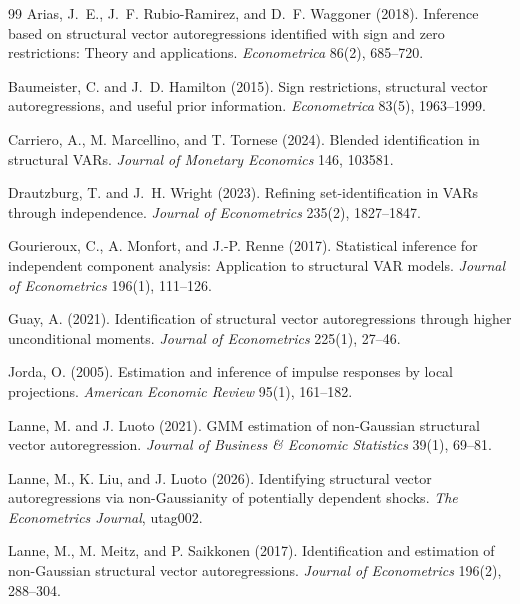 \documentclass[11pt]{article}
\theoremstyle{definition}
\theoremstyle{plain}
\theoremstyle{remark}
\begin{document}
\begin{thebibliography}{99}
Arias, J.~E., J.~F. Rubio-Ramirez, and D.~F. Waggoner (2018).
Inference based on structural vector autoregressions identified with sign and zero restrictions: Theory and applications.
\emph{Econometrica} 86(2), 685--720.

Baumeister, C. and J.~D. Hamilton (2015).
Sign restrictions, structural vector autoregressions, and useful prior information.
\emph{Econometrica} 83(5), 1963--1999.

Carriero, A., M. Marcellino, and T. Tornese (2024).
Blended identification in structural VARs.
\emph{Journal of Monetary Economics} 146, 103581.

Drautzburg, T. and J.~H. Wright (2023).
Refining set-identification in VARs through independence.
\emph{Journal of Econometrics} 235(2), 1827--1847.

Gourieroux, C., A. Monfort, and J.-P. Renne (2017).
Statistical inference for independent component analysis: Application to structural VAR models.
\emph{Journal of Econometrics} 196(1), 111--126.

Guay, A. (2021).
Identification of structural vector autoregressions through higher unconditional moments.
\emph{Journal of Econometrics} 225(1), 27--46.

Jorda, O. (2005).
Estimation and inference of impulse responses by local projections.
\emph{American Economic Review} 95(1), 161--182.

Lanne, M. and J. Luoto (2021).
GMM estimation of non-Gaussian structural vector autoregression.
\emph{Journal of Business \& Economic Statistics} 39(1), 69--81.

Lanne, M., K. Liu, and J. Luoto (2026).
Identifying structural vector autoregressions via non-Gaussianity of potentially dependent shocks.
\emph{The Econometrics Journal}, utag002.

Lanne, M., M. Meitz, and P. Saikkonen (2017).
Identification and estimation of non-Gaussian structural vector autoregressions.
\emph{Journal of Econometrics} 196(2), 288--304.


\end{thebibliography}
\end{document}
